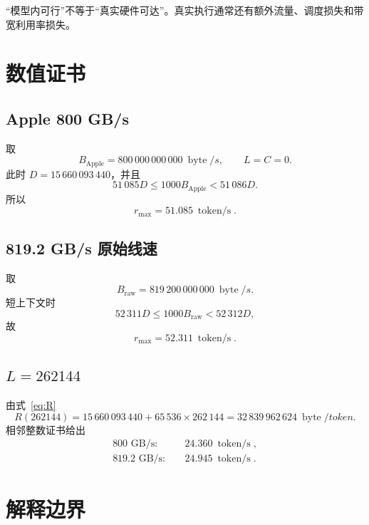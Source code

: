 \documentclass[11pt,a4paper]{ctexart}
\newcommand{\bytes}{\operatorname{byte}}
\newcommand{\tps}{\operatorname{token/s}}
\begin{document}
“模型内可行”不等于“真实硬件可达”。真实执行通常还有额外流量、调度损失和带宽利用率损失。

\section{数值证书}

\subsection{Apple 800 GB/s}
取
\[
B_{\mathrm{Apple}}=800\,000\,000\,000\ \bytes/s,
\qquad L=C=0.
\]
此时 $D=15\,660\,093\,440$，并且
\begin{equation}
51\,085D\le1000B_{\mathrm{Apple}}<51\,086D.
\end{equation}
所以
\begin{equation}
  \boxed{r_{\max}=51.085\ \tps}.
\end{equation}

\subsection{819.2 GB/s 原始线速}
取
\[
B_{\mathrm{raw}}=819\,200\,000\,000\ \bytes/s.
\]
短上下文时
\begin{equation}
52\,311D\le1000B_{\mathrm{raw}}<52\,312D,
\end{equation}
故
\begin{equation}
  \boxed{r_{\max}=52.311\ \tps}.
\end{equation}

\subsection{$L=262144$}
由式~\eqref{eq:R}
\begin{equation}
R(262144)
=15\,660\,093\,440+65\,536\times262\,144
=32\,839\,962\,624\ \bytes/token.
\end{equation}
相邻整数证书给出
\begin{equation}
\boxed{
\begin{aligned}
800\text{ GB/s}:&\quad24.360\ \tps,\\
819.2\text{ GB/s}:&\quad24.945\ \tps.
\end{aligned}}
\end{equation}

\section{解释边界}
\end{document}
